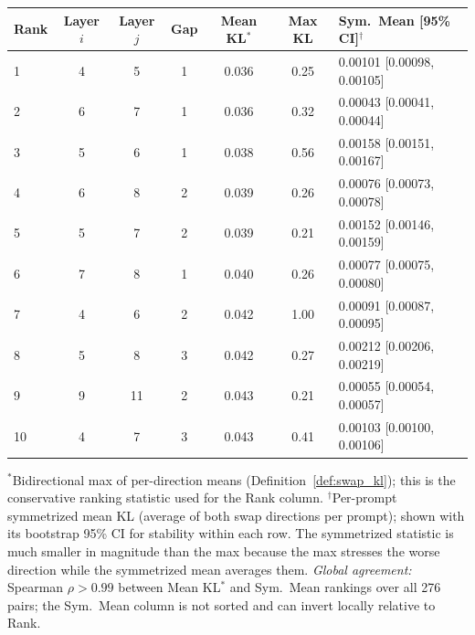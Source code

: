 \documentclass{article}
\newenvironment{tabhere}{%
  \par\medskip
  \begin{center}
}{%
  \end{center}
  \medskip
}
\begin{document}
\begin{tabhere}
\small
\begin{tabular}{lcccccl}
\toprule
Rank & Layer $i$ & Layer $j$ & Gap & Mean KL$^*$ & Max KL & Sym.\ Mean [95\% CI]$^\dagger$ \\
\midrule
1 & 4 & 5 & 1 & 0.036 & 0.25 & 0.00101 [0.00098, 0.00105] \\
2 & 6 & 7 & 1 & 0.036 & 0.32 & 0.00043 [0.00041, 0.00044] \\
3 & 5 & 6 & 1 & 0.038 & 0.56 & 0.00158 [0.00151, 0.00167] \\
4 & 6 & 8 & 2 & 0.039 & 0.26 & 0.00076 [0.00073, 0.00078] \\
5 & 5 & 7 & 2 & 0.039 & 0.21 & 0.00152 [0.00146, 0.00159] \\
6 & 7 & 8 & 1 & 0.040 & 0.26 & 0.00077 [0.00075, 0.00080] \\
7 & 4 & 6 & 2 & 0.042 & 1.00 & 0.00091 [0.00087, 0.00095] \\
8 & 5 & 8 & 3 & 0.042 & 0.27 & 0.00212 [0.00206, 0.00219] \\
9 & 9 & 11 & 2 & 0.043 & 0.21 & 0.00055 [0.00054, 0.00057] \\
10 & 4 & 7 & 3 & 0.043 & 0.41 & 0.00103 [0.00100, 0.00106] \\
\bottomrule
\end{tabular}
\vspace{2pt}
\small{$^*$Bidirectional max of per-direction means (Definition~\ref{def:swap_kl}); this is the conservative ranking statistic used for the Rank column. $^\dagger$Per-prompt symmetrized mean KL (average of both swap directions per prompt); shown with its bootstrap 95\% CI for stability within each row. The symmetrized statistic is much smaller in magnitude than the max because the max stresses the worse direction while the symmetrized mean averages them. \emph{Global agreement:} Spearman $\rho > 0.99$ between Mean KL$^*$ and Sym.\ Mean rankings over all 276 pairs; the Sym.\ Mean column is not sorted and can invert locally relative to Rank.}
\label{tab:top_pairs}
\end{tabhere}
\end{document}
